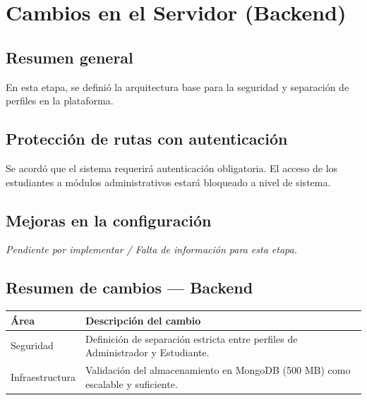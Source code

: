 \section{Cambios en el Servidor
(Backend)}\label{cambios-en-el-servidor-backend}

\subsection{Resumen general}\label{resumen-general}

En esta etapa, se definió la arquitectura base para la seguridad y
separación de perfiles en la plataforma.

\subsection{Protección de rutas con
autenticación}\label{protecciuxf3n-de-rutas-con-autenticaciuxf3n}

Se acordó que el sistema requerirá autenticación obligatoria. El acceso
de los estudiantes a módulos administrativos estará bloqueado a nivel de
sistema.

\subsection{Mejoras en la
configuración}\label{mejoras-en-la-configuraciuxf3n}

\emph{Pendiente por implementar / Falta de información para esta etapa.}

\subsection{Resumen de cambios ---
Backend}\label{resumen-de-cambios-backend}

{\def\LTcaptype{none} %
\begin{longtable}[]{@{}
  >{\raggedright\arraybackslash}p{}
  >{\raggedright\arraybackslash}p{}@{}}
\toprule\noalign{}
\begin{minipage}[b]{\linewidth}\raggedright
Área
\end{minipage} & \begin{minipage}[b]{\linewidth}\raggedright
Descripción del cambio
\end{minipage} \\
\midrule\noalign{}
\endhead
\bottomrule\noalign{}
\endlastfoot
Seguridad & Definición de separación estricta entre perfiles de
Administrador y Estudiante. \\
Infraestructura & Validación del almacenamiento en MongoDB (500 MB) como
escalable y suficiente. \\
\end{longtable}
}

